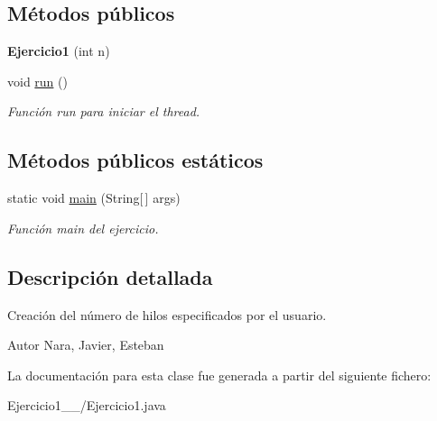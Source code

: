 \subsection*{Métodos públicos}
\begin{DoxyCompactItemize}
\item 
\hypertarget{class_ejercicio1__2__1_1_1_ejercicio1_ad1f2c70cdbcba131faafb12f2dd15db2}{}{\bfseries Ejercicio1} (int n)\label{class_ejercicio1__2__1_1_1_ejercicio1_ad1f2c70cdbcba131faafb12f2dd15db2}

\item 
\hypertarget{class_ejercicio1__2__1_1_1_ejercicio1_a859e2a8b18a0a631b83828af1bd55de4}{}void \hyperlink{class_ejercicio1__2__1_1_1_ejercicio1_a859e2a8b18a0a631b83828af1bd55de4}{run} ()\label{class_ejercicio1__2__1_1_1_ejercicio1_a859e2a8b18a0a631b83828af1bd55de4}

\begin{DoxyCompactList}\small\item\em Función run para iniciar el thread. \end{DoxyCompactList}\end{DoxyCompactItemize}
\subsection*{Métodos públicos estáticos}
\begin{DoxyCompactItemize}
\item 
\hypertarget{class_ejercicio1__2__1_1_1_ejercicio1_a2e65f0073f5378723ce1c4869865124c}{}static void \hyperlink{class_ejercicio1__2__1_1_1_ejercicio1_a2e65f0073f5378723ce1c4869865124c}{main} (String\mbox{[}$\,$\mbox{]} args)\label{class_ejercicio1__2__1_1_1_ejercicio1_a2e65f0073f5378723ce1c4869865124c}

\begin{DoxyCompactList}\small\item\em Función main del ejercicio. \end{DoxyCompactList}\end{DoxyCompactItemize}


\subsection{Descripción detallada}
Creación del número de hilos especificados por el usuario. 

\begin{DoxyAuthor}{Autor}
Nara, Javier, Esteban 
\end{DoxyAuthor}


La documentación para esta clase fue generada a partir del siguiente fichero\+:\begin{DoxyCompactItemize}
\item 
Ejercicio1\+\_\+\_/Ejercicio1.\+java\end{DoxyCompactItemize}
